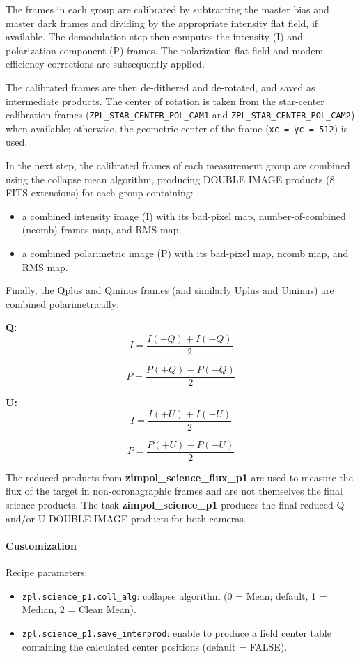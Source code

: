 The frames in each group are calibrated by subtracting the master bias and master dark frames and dividing by the appropriate intensity flat field, if available.
The demodulation step then computes the intensity (I) and polarization component (P) frames.
The polarization flat-field and modem efficiency corrections are subsequently applied.

The calibrated frames are then de-dithered and de-rotated, and saved as intermediate products.
The center of rotation is taken from the star-center calibration frames
(\texttt{ZPL\_STAR\_CENTER\_POL\_CAM1} and
\texttt{ZPL\_STAR\_CENTER\_POL\_CAM2}) when available;
otherwise, the geometric center of the frame (\texttt{xc = yc = 512}) is used.

In the next step, the calibrated frames of each measurement group are combined using the collapse mean algorithm,
producing DOUBLE IMAGE products (8 FITS extensions) for each group containing:

\begin{itemize}
\item a combined intensity image (I) with its bad-pixel map, number-of-combined (ncomb) frames map, and RMS map;
\item a combined polarimetric image (P) with its bad-pixel map, ncomb map, and RMS map.
\end{itemize}

Finally, the Qplus and Qminus frames (and similarly Uplus and Uminus) are combined polarimetrically:

\textbf{Q:}
\[
I = \frac{I(+Q) + I(-Q)}{2}
\]

\[
P = \frac{P(+Q) - P(-Q)}{2}
\]

\textbf{U:}
\[
I = \frac{I(+U) + I(-U)}{2}
\]

\[
P = \frac{P(+U) - P(-U)}{2}
\]

The reduced products from \textbf{zimpol\_science\_flux\_p1} are used to measure the flux of the target in non-coronagraphic frames and are not themselves the final science products.
The task \textbf{zimpol\_science\_p1} produces the final reduced Q and/or U DOUBLE IMAGE products for both cameras.

\paragraph{Customization}

Recipe parameters:
\begin{itemize}
\item \texttt{zpl.science\_p1.coll\_alg}: collapse algorithm
(0 = Mean; default, 1 = Median, 2 = Clean Mean).
\item \texttt{zpl.science\_p1.save\_interprod}: enable to produce
a field center table containing the calculated center positions
(default = FALSE).
\end{itemize}



